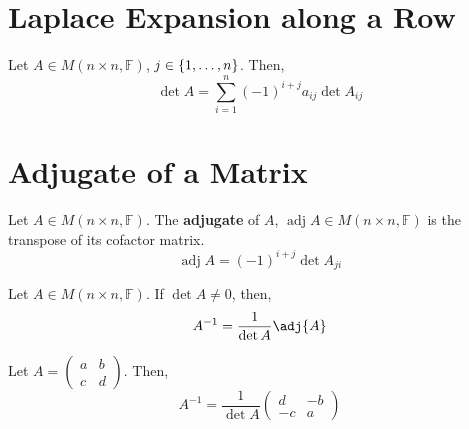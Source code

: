 \documentclass[letterpaper,12pt]{article}
\begin{document}
\section*{Laplace Expansion along a Row}
\begin{corollary}
Let $A \in M(n \times n, \mathbb{F})$, $j \in \left\{ 1, \dots, n \right\}$. Then,
\begin{equation*}
    \boxed{\det{A} = \sum_{i=1}^n (-1)^{i+j} a_{ij} \det{A_{ij}}}
\end{equation*}
\end{corollary}

\section*{Adjugate of a Matrix}
\begin{definition}
Let $A \in M(n \times n, \mathbb{F})$. The \textbf{adjugate} of $A$, $\operatorname{adj}{A} \in M(n \times n, \mathbb{F})$ is the transpose of its cofactor matrix.
\begin{equation*}
    \operatorname{adj}{A} = (-1)^{i+j} \det{A_{ji}}
\end{equation*}
\end{definition}

\begin{theorem}
Let $A \in M(n \times n, \mathbb{F})$. If $\det{A} \neq 0$, then,
\begin{equation*}
    A^{-1} = \dfrac{1}{\det{A}} \adj{A}
\end{equation*}
\end{theorem}

\begin{corollary}
Let $A = \begin{pmatrix} a & b \\ c & d \end{pmatrix}$. Then,
\begin{equation*}
    \boxed{A^{-1} = \dfrac{1}{\det{A}} \begin{pmatrix} d & -b \\ -c & a \end{pmatrix}}
\end{equation*}
\end{corollary}
\end{document}
